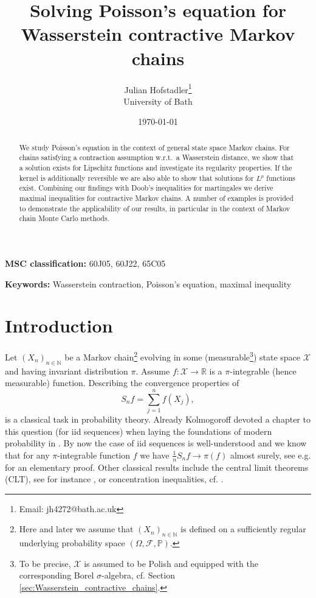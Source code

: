 \documentclass[12pt]{article}
\title{
Solving Poisson's equation for Wasserstein contractive Markov chains
}
\author{Julian Hofstadler\thanks{Email: jh4272@bath.ac.uk}\\[1ex]University of Bath}
\date{\today}
\theoremstyle{plain}
\newcommand{\N}{\mathbb{N}}
\newcommand{\R}{\mathbb{R}}
\newcommand{\cX}{\mathcal{X}}
\begin{document}
	\maketitle

\begin{abstract}
\noindent
We study Poisson's equation in the context of general state space Markov chains. For chains satisfying a contraction assumption w.r.t.~a Wasserstein distance, we show that a solution exists for Lipschitz functions and investigate its regularity properties. If the kernel is additionally reversible we are also able to show that solutions for $L^p$ functions exist. Combining our findings with Doob's inequalities for martingales we derive maximal inequalities for contractive Markov chains. A number of examples is provided to demonstrate the applicability of our results, in particular in the context of Markov chain Monte Carlo methods. 
\end{abstract}

\noindent
\textbf{MSC classification:} 60J05, 60J22, 65C05

\noindent
\textbf{Keywords:} Wasserstein contraction, Poisson's equation, maximal inequality

\section{Introduction}
Let $(X_n)_{n \in \N}$ be a Markov chain\footnote{Here and later we assume that $(X_n)_{n \in \N}$ is defined on a sufficiently regular underlying probability space $(\Omega, \mathcal{F}, \mathbb{P})$.} evolving in some (measurable\footnote{To be precise, $\cX$ is assumed to be Polish and equipped with the corresponding Borel $\sigma$-algebra, cf. Section \ref{sec:Wasserstein_contractive_chains}.}) state space $\cX$ and having invariant distribution $\pi$. Assume $f \colon \cX \to \R$ is a $\pi$-integrable (hence measurable) function. 
Describing the convergence properties of 
\[
S_n f = \sum_{j=1}^{n}f(X_j),
\]
is a classical task in probability theory. 
Already Kolmogoroff devoted a chapter to this question (for iid sequences) when laying the foundations of modern probability in \cite{kolmogoroff1933grundbegriffe}.
By now the case of iid sequences is well-understood and we know that for any $\pi$-integrable function $f$ we have $\frac{1}{n} S_n f \to \pi(f)$ almost surely, see e.g. \cite{etemadi1981elementary} for an elementary proof. 
Other classical results include the central limit theorems (CLT), see for instance \cite{dudley2002real}, or concentration inequalities, cf. \cite[Appendix B]{pollard1984stochastic}. 
\end{document}
